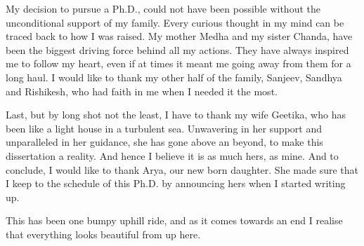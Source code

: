 \begin{acknowledgements}
My decision to pursue a Ph.D., could not have been possible without the unconditional support of my family. Every curious thought in my mind can be traced back to how I was raised. My mother Medha and my sister Chanda, have been the biggest driving force behind all my actions. They have always inspired me to follow my heart, even if at times it meant me going away from them for a long haul. I would like to thank my other half of the family, Sanjeev, Sandhya and Rishikesh, who had faith in me when I needed it the most.

Last, but by long shot not the least, I have to thank my wife Geetika, who has been like a light house in a turbulent sea. Unwavering in her support and unparalleled in her guidance, she has gone above an beyond, to make this dissertation a reality. And hence I believe it is as much hers, as mine. And to conclude, I would like to thank Arya, our new born daughter. She made sure that I keep to the schedule of this Ph.D. by announcing hers when I started writing up. 

This has been one bumpy uphill ride, and as it comes towards an end I realise that everything looks beautiful from up here.
\end{acknowledgements}
